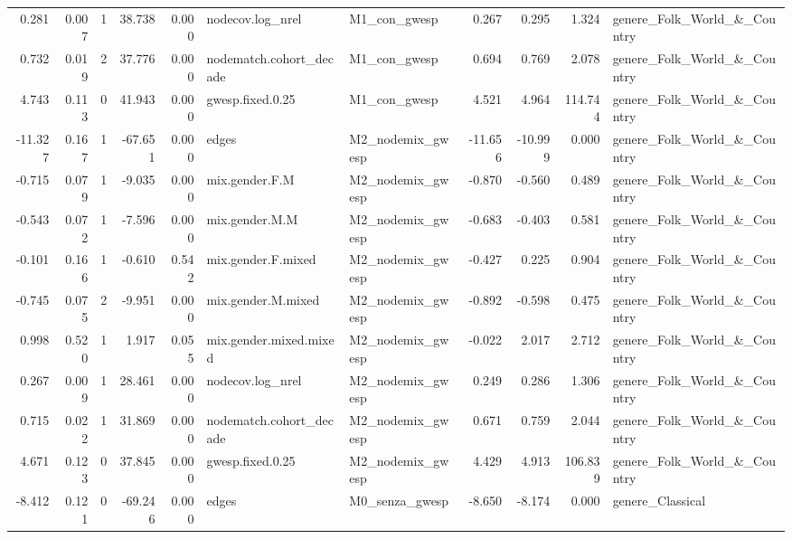\begin{table}
\begin{tabular}{rrrrrllrrrl}
    0.281 & 0.007 &        1 &   38.738 &     0.000 &        nodecov.log\_nrel &     M1\_con\_gwesp &   0.267 &   0.295 &   1.324 & genere\_Folk\_World\_\&\_Country \\
    0.732 & 0.019 &        2 &   37.776 &     0.000 & nodematch.cohort\_decade &     M1\_con\_gwesp &   0.694 &   0.769 &   2.078 & genere\_Folk\_World\_\&\_Country \\
    4.743 & 0.113 &        0 &   41.943 &     0.000 &        gwesp.fixed.0.25 &     M1\_con\_gwesp &   4.521 &   4.964 & 114.744 & genere\_Folk\_World\_\&\_Country \\
  -11.327 & 0.167 &        1 &  -67.651 &     0.000 &                   edges & M2\_nodemix\_gwesp & -11.656 & -10.999 &   0.000 & genere\_Folk\_World\_\&\_Country \\
   -0.715 & 0.079 &        1 &   -9.035 &     0.000 &          mix.gender.F.M & M2\_nodemix\_gwesp &  -0.870 &  -0.560 &   0.489 & genere\_Folk\_World\_\&\_Country \\
   -0.543 & 0.072 &        1 &   -7.596 &     0.000 &          mix.gender.M.M & M2\_nodemix\_gwesp &  -0.683 &  -0.403 &   0.581 & genere\_Folk\_World\_\&\_Country \\
   -0.101 & 0.166 &        1 &   -0.610 &     0.542 &      mix.gender.F.mixed & M2\_nodemix\_gwesp &  -0.427 &   0.225 &   0.904 & genere\_Folk\_World\_\&\_Country \\
   -0.745 & 0.075 &        2 &   -9.951 &     0.000 &      mix.gender.M.mixed & M2\_nodemix\_gwesp &  -0.892 &  -0.598 &   0.475 & genere\_Folk\_World\_\&\_Country \\
    0.998 & 0.520 &        1 &    1.917 &     0.055 &  mix.gender.mixed.mixed & M2\_nodemix\_gwesp &  -0.022 &   2.017 &   2.712 & genere\_Folk\_World\_\&\_Country \\
    0.267 & 0.009 &        1 &   28.461 &     0.000 &        nodecov.log\_nrel & M2\_nodemix\_gwesp &   0.249 &   0.286 &   1.306 & genere\_Folk\_World\_\&\_Country \\
    0.715 & 0.022 &        1 &   31.869 &     0.000 & nodematch.cohort\_decade & M2\_nodemix\_gwesp &   0.671 &   0.759 &   2.044 & genere\_Folk\_World\_\&\_Country \\
    4.671 & 0.123 &        0 &   37.845 &     0.000 &        gwesp.fixed.0.25 & M2\_nodemix\_gwesp &   4.429 &   4.913 & 106.839 & genere\_Folk\_World\_\&\_Country \\
   -8.412 & 0.121 &        0 &  -69.246 &     0.000 &                   edges &   M0\_senza\_gwesp &  -8.650 &  -8.174 &   0.000 &            genere\_Classical \\

\end{tabular}
\end{table}
